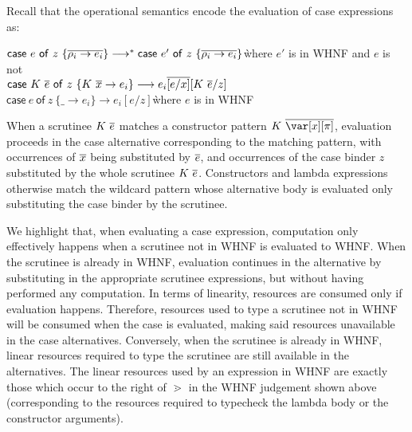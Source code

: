 \documentclass[acmsmall, screen, review]{acmart}
\newcommand{\ccase}[2]{\mathsf{case}~#1~\mathsf{of}~#2}
\begin{document}
Recall that the operational semantics encode the evaluation of case expressions as:
%
\begin{tabbing}
$\ccase{e}{z~\{\ov{\rho_i \to e_i}\}} \longrightarrow^* \ccase{e'}{z~\{\ov{\rho_i \to e_i}\}}$\`where $e'$ is in WHNF and $e$ is not\\
$\ccase{K~\ov{e}}{z~\{K~\ov{x} \to e_i\}} \longrightarrow e_i\ov{[e/x]}[K~\ov{e}/z]$\\
$\ccase{e}{z~\{\_ \to e_i\}} \longrightarrow e_i[e/z]$\`where $e$ is in WHNF\\
\end{tabbing}
%
When a scrutinee $K~\overline{e}$ matches a constructor pattern $K~\ov{\x[\pi]}$,
evaluation proceeds in the case alternative corresponding to the matching
pattern, with occurrences of $\overline{x}$ being substituted by $\overline{e}$, and
occurrences of the case binder $z$ substituted by the whole scrutinee
$K~\overline{e}$. Constructors and lambda expressions otherwise match the wildcard
pattern whose alternative body is evaluated only substituting the case binder by the
scrutinee. 

We highlight that, when evaluating a case expression, computation only
effectively happens when a scrutinee not in WHNF is evaluated to WHNF. When the
scrutinee is already in WHNF, evaluation continues in the alternative by
substituting in the appropriate scrutinee expressions, but without having
performed any computation.
%
In terms of linearity, resources are consumed only if evaluation happens.
Therefore, resources used to type a scrutinee not in
WHNF will be consumed when the case is evaluated, making said resources unavailable in the case
alternatives. Conversely, when the scrutinee is already in WHNF, linear
resources required to type the scrutinee are still available in the alternatives.
The linear resources used by an expression in WHNF are exactly those which
occur to the right of $\gtrdot$ in the WHNF judgement shown above
(corresponding to the resources required to typecheck the lambda body or the
constructor arguments).

%
%
%
%
%
\end{document}
